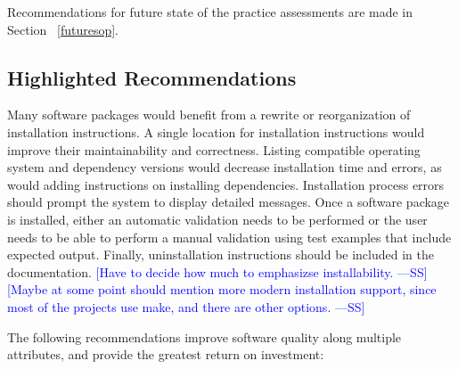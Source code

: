 \documentclass[final, 3p, times, authoryear]{elsarticle}
\newcommand{\authornote}[3]{\textcolor{#1}{[#3 ---#2]}}
\newcommand{\authornote}[3]{}
\newcommand{\wss}[1]{\authornote{blue}{SS}{#1}} %
\begin{document}
Recommendations for future state of the practice assessments are made in Section
~\ref{futuresop}.

\subsection{Highlighted Recommendations} \label{highlightedrecommendations}

Many software packages would benefit from a rewrite or reorganization of
installation instructions. A single location for installation instructions would
improve their maintainability and correctness. Listing compatible operating
system and dependency versions would decrease installation time and errors, as
would adding instructions on installing dependencies. Installation process
errors should prompt the system to display detailed messages. Once a software
package is installed, either an automatic validation needs to be performed or
the user needs to be able to perform a manual validation using test examples
that include expected output. Finally, uninstallation instructions should be
included in the documentation. \wss{Have to decide how much to emphasizse
installability.}  \wss{Maybe at some point should mention more modern
installation support, since most of the projects use make, and there are other
options.}

The following recommendations improve software quality along multiple
attributes, and provide the greatest return on investment:
\end{document}

